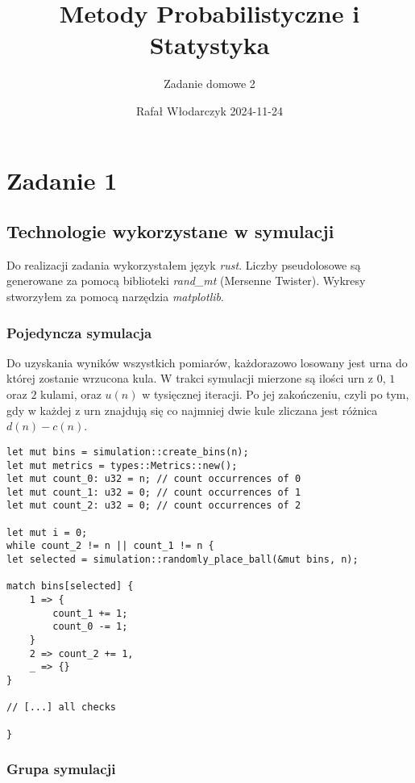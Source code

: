\documentclass{article}
\title{Metody Probabilistyczne i Statystyka}
\author{Zadanie domowe 2}
\date{Rafał Włodarczyk 2024-11-24}
\begin{document}
\maketitle

\tableofcontents

\section{Zadanie 1}

\subsection{Technologie wykorzystane w symulacji}

Do realizacji zadania wykorzystałem język \textit{rust}. Liczby pseudolosowe są generowane za pomocą biblioteki \textit{rand\_mt} (Mersenne Twister). Wykresy stworzyłem za pomocą narzędzia \textit{matplotlib}. 

\subsubsection{Pojedyncza symulacja}

Do uzyskania wyników wszystkich pomiarów, każdorazowo losowany jest urna do której zostanie wrzucona kula. W trakci symulacji mierzone są ilości urn z $0$, $1$ oraz $2$ kulami, oraz $u(n)$ w tysięcznej iteracji. Po jej zakończeniu, czyli po tym, gdy w każdej z urn znajdują się co najmniej dwie kule zliczana jest różnica $d(n)-c(n)$.

\begin{verbatim}
let mut bins = simulation::create_bins(n);
let mut metrics = types::Metrics::new();
let mut count_0: u32 = n; // count occurrences of 0
let mut count_1: u32 = 0; // count occurrences of 1
let mut count_2: u32 = 0; // count occurrences of 2

let mut i = 0;
while count_2 != n || count_1 != n {
let selected = simulation::randomly_place_ball(&mut bins, n);

match bins[selected] {
    1 => {
        count_1 += 1;
        count_0 -= 1;
    }
    2 => count_2 += 1,
    _ => {}
}

// [...] all checks

}
\end{verbatim}

\subsubsection{Grupa symulacji}
\end{document}
